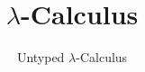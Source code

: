 
\title{\texorpdfstring{$\lambda$}{λ}-Calculus}
\subtitle{Untyped \texorpdfstring{$\lambda$}{λ}-Calculus}


\bgroup
  \begin{frame}
    \maketitle
  \end{frame}
\egroup

%
%

